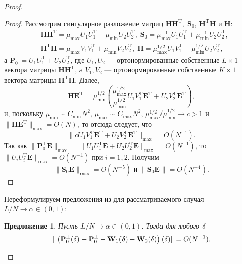 \documentclass[specialist,
substylefile = spbu_report.rtx,
subf,href,colorlinks=true, 12pt]{disser}
\let\H\relax
\DeclareMathOperator\H{\mathbf{H}}
\newtheorem{sentence}{Предложение}
\begin{document}
\begin{proof}
		\begin{proof}
			Рассмотрим сингулярное разложение матриц $\mathbf{HH}^\mathrm{T},\;\mathbf{S}_0$, $\mathbf{H}^\mathrm{T}\mathbf{H}$ и $\mathbf{H}$:
			\begin{align*}
				&\mathbf{HH}^\mathrm{T} = \mu_{\max}U_1U_1^\mathrm{T}+\mu_{\min}U_2U_2^\mathrm{T},\; \mathbf{S}_0=\mu_{\max}^{-1}U_1U_1^\mathrm{T}+\mu_{\min}^{-1}U_2U_2^\mathrm{T},\\
				&\mathbf{H}^\mathrm{T}\mathbf{H}=\mu_{\max}V_1V_1^\mathrm{T}+\mu_{\min}V_2V_2^\mathrm{T},\;\mathbf{H}=\mu_{\max}^{1/2}U_1V_1^\mathrm{T}+\mu_{\min}^{1/2}U_2V_2^\mathrm{T},
			\end{align*}
			а $\mathbf{P}_0^\bot = U_1U_1^\mathrm{T} + U_2U_2^\mathrm{T}$, где $U_1,U_2$ --- ортонормированные собственные $L\times 1$ вектора матрицы $\mathbf{HH}^\mathrm{T}$, а $V_1, V_2$ --- ортонормированные собственные $K\times 1$ вектора матрицы $\mathbf{H}^\mathrm{T}\mathbf{H}$. Далее,
			\begin{equation*}
				\mathbf{HE}^\mathrm{T} = \mu_{\min}^{1/2}\left(\dfrac{\mu_{\max}^{1/2}}{\mu_{\min}^{1/2}}U_1V_1^\mathrm{T}\mathbf{E}^\mathrm{T}+U_2V_2^\mathrm{T}\mathbf{E}^\mathrm{T}\right),
			\end{equation*}
			и, поскольку $\mu_{\min}\sim C_{\min}N^2,\,\mu_{\max}\sim C_{\max}N^2,\,\mu_{\max}^{1/2}/\mu_{\min}^{1/2}\rightarrow c>1$ и $\|\mathbf{HE}^\mathrm{T}\|_{\max}=O(N)$, то отсюда следует, что
			\begin{equation*}
				\|cU_1V_1^\mathrm{T}\mathbf{E}^\mathrm{T}+U_2V_2^\mathrm{T}\mathbf{E}^\mathrm{T}\|_{\max}=O(N^{-1}).
			\end{equation*}
			Так как $\|\mathbf{P}_0^\bot\mathbf{E}\|_{\max}=\|U_1U_1^\mathrm{T}\mathbf{E}+U_2U_2^\mathrm{T}\mathbf{E}\|_{\max}=O(N^{-1})$, то $\|U_iU_i^\mathrm{T}\mathbf{E}\|_{\max}=O(N^{-1})$ при $i=1,2$. Получим
			\begin{equation*}
				\|\mathbf{S}_0\mathbf{E}\|_{\max}=O(N^{-5}) \textrm{ и } \|\mathbf{S}_0\mathbf{E}\|=O(N^{-4}).
			\end{equation*} 
		\end{proof}
		Переформулируем предложения из \cite{ZNekrutkin} для рассматриваемого случая $L/N\rightarrow\alpha\in(0,1)$:
		\begin{sentence}
			Пусть $L/N\rightarrow\alpha\in(0,1)$. Тогда для любого $\delta$
			\begin{equation*}
				\|\left(\mathbf{P}_0^\bot(\delta) - \mathbf{P}_0^\bot - \mathbf{W}_1(\delta) - \mathbf{W}_2(\delta)\right)\H(\delta)\| = O(N^{-1}).
			\end{equation*}
		\end{sentence}
		

\end{proof}
\end{document}
